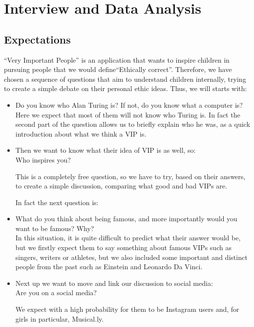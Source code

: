 \documentclass[12pt]{scrartcl}
\begin{document}
\section*{Interview and Data Analysis}
		\subsection*{Expectations}

	 ``Very Important People'' is an application that wants to inspire 
	children in pursuing people that we would define``Ethically correct''. Therefore, we have 
	chosen a sequence of questions that aim to understand children internally, trying to create a 		
	simple debate on their personal ethic ideas. Thus, we will starts with:

	\begin{itemize}
		\item Do you know who Alan Turing is? If not, do you know what a computer is?\\
		Here we expect that most of them will not know who Turing is. In fact the second part of the 
		question allows us to briefly explain who he was,  as a quick introduction about what we think 
		a VIP is.

		\item Then we want to know what their idea of VIP is as well, so:\\
		Who inspires you?
		
		This is a completely free question, so we have to try, based on their answers, to create a simple 
		discussion, comparing what good and bad VIPs are.
		
		In fact the next question is:
		
		\item What do you think about being famous, and more importantly would you want to be 
		famous? Why?\\

		In this situation, it is quite difficult to predict what their answer would be, but we firstly expect 
		them to say something about famous VIPs such as singers, writers or athletes, but we also 
		included some important and distinct people from the past such as Einstein and Leonardo Da 
		Vinci.

		\item Next up we want to move and link our discussion to social media:\\
		Are you on a social media?

		We expect with a high probability for them to be Instagram users and, for girls in particular,
		Musical.ly.


\end{itemize}
\end{document}
